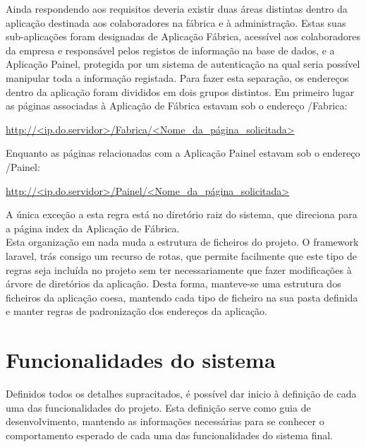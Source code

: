 \noindent 
Ainda respondendo aos requisitos deveria existir duas áreas distintas dentro da aplicação destinada aos colaboradores na fábrica e à administração.
Estas suas sub-aplicações foram designadas de Aplicação Fábrica, acessível aos colaboradores da empresa e responsável pelos registos de informação na base de dados, e a Aplicação Painel, protegida por um sistema de autenticação na qual seria possível manipular toda a informação registada.
Para fazer esta separação, os endereços dentro da aplicação foram divididos em dois grupos distintos. Em primeiro lugar as páginas associadas à Aplicação de Fábrica estavam sob o endereço /Fabrica:

\begin{center}
\url{http://<ip.do.servidor>/Fabrica/<Nome_da_página_solicitada>}
\end{center}

\noindent 
Enquanto as páginas relacionadas com a Aplicação Painel estavam sob o endereço /Painel:

\begin{center}
	\url{http://<ip.do.servidor>/Painel/<Nome_da_página_solicitada>}
\end{center}

\noindent 
A única exceção a esta regra está no diretório raiz do sistema, que direciona para a página index da Aplicação de Fábrica.\\
Esta organização em nada muda a estrutura de ficheiros do projeto. O framework laravel, trás consigo um recurso de rotas, que permite facilmente que este tipo de regras seja incluída no projeto sem ter necessariamente que fazer modificações à árvore de diretórios da aplicação. Desta forma, manteve-se uma estrutura dos ficheiros da aplicação coesa, mantendo cada tipo de ficheiro na sua pasta definida e manter regras de padronização dos endereços da aplicação.

\section{Funcionalidades do sistema}
Definidos todos os detalhes supracitados, é possível dar inicio à definição de cada uma das funcionalidades do projeto. Esta definição serve como guia de desenvolvimento, mantendo as informações necessárias para se conhecer o comportamento esperado de cada uma das funcionalidades do sistema final.